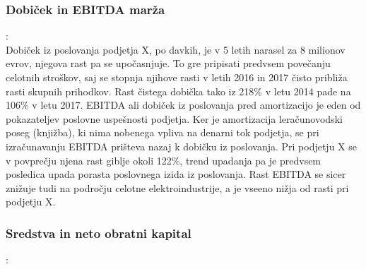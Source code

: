 \documentclass[12pt,a4paper]{amsart}
\theoremstyle{definition} %
\theoremstyle{plain} %
\begin{document}
\subsubsection{Dobiček in EBITDA marža}:\\

Dobiček iz poslovanja podjetja X, po davkih, je v 5 letih narasel za 8 milionov evrov, njegova rast pa se upočasnjuje. To gre pripisati predvsem povečanju celotnih stroškov, saj se stopnja njihove rasti v letih 2016 in 2017 čisto približa rasti skupnih prihodkov. Rast čistega dobička tako iz 218\% v letu 2014 pade na 106\% v letu 2017.
EBITDA ali dobiček iz poslovanja pred amortizacijo je eden od pokazateljev poslovne uspešnosti podjetja. Ker je amortizacija leračunovodski poseg (knjižba), ki nima nobenega vpliva na denarni tok podjetja, se pri izračunavanju EBITDA prišteva nazaj k dobičku iz poslovanja. Pri podjetju X se v povprečju njena rast giblje okoli 122\%, trend upadanja pa je predvsem posledica upada porasta poslovnega izida iz poslovanja. Rast EBITDA se sicer znižuje tudi na področju celotne elektroindustrije, a je vseeno nižja od rasti pri podjetju X. \\


\subsubsection{Sredstva in neto obratni kapital}:\\
\end{document}
